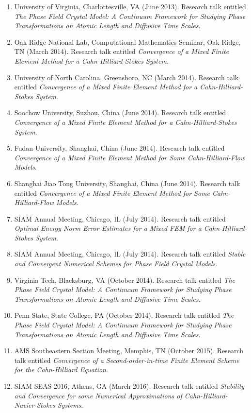 \documentclass[11pt]{letter}
\begin{document}
\begin{enumerate}
	\item
University of Virginia, Charlottesville, VA (June 2013).  Research talk entitled {\sl The Phase Field Crystal Model: A Continuum Framework for Studying Phase Transformations on Atomic Length and Diffusive Time Scales}.
	\item
Oak Ridge National Lab, Computational Mathematics Seminar, Oak Ridge, TN (March 2014). Research talk entitled {\sl Convergence of a Mixed Finite Element Method for a Cahn-Hilliard-Stokes System}.
	\item
University of North Carolina, Greensboro, NC (March 2014). Research talk entitled {\sl Convergence of a Mixed Finite Element Method for a Cahn-Hilliard-Stokes System}.
	\item
Soochow University, Suzhou, China (June 2014). Research talk entitled {\sl Convergence of a Mixed Finite Element Method for a Cahn-Hilliard-Stokes System}.
	\item
Fudan University, Shanghai, China (June 2014). Research talk entitled {\sl Convergence of a Mixed Finite Element Method for Some Cahn-Hilliard-Flow Models}.
	\item
Shanghai Jiao Tong University, Shanghai, China (June 2014). Research talk entitled {\sl Convergence of a Mixed Finite Element Method for Some Cahn-Hilliard-Flow Models}.
	\item
SIAM Annual Meeting, Chicago, IL (July 2014). Research talk entitled {\sl Optimal Energy Norm Error Estimates for a Mixed FEM for a Cahn-Hilliard-Stokes System}.
	\item
SIAM Annual Meeting, Chicago, IL (July 2014). Research talk entitled {\sl Stable and Convergent Numerical Schemes for Phase Field Crystal Models}.
	\item
Virginia Tech, Blacksburg, VA (October 2014).  Research talk entitled {\sl The Phase Field Crystal Model: A Continuum Framework for Studying Phase Transformations on Atomic Length and Diffusive Time Scales}.
	\item
Penn State, State College, PA (October 2014).  Research talk entitled {\sl The Phase Field Crystal Model: A Continuum Framework for Studying Phase Transformations on Atomic Length and Diffusive Time Scales}.
	\item
AMS Southeastern Section Meeting, Memphis, TN (October 2015). Research talk entitled {\sl Convergence of a Second-order-in-time Finite Element Scheme for the Cahn-Hilliard Equation}.
	\item
SIAM SEAS 2016, Athens, GA (March 2016). Research talk entitled {\sl Stability and Convergence for some Numerical Approximations of Cahn-Hilliard-Navier-Stokes Systems}.

\end{enumerate}
\end{document}

